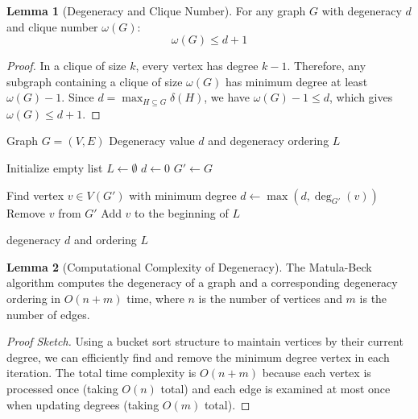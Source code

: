 \documentclass{article}
\theoremstyle{definition}
\newtheorem{lemma}{Lemma}
\begin{document}
\begin{lemma}[Degeneracy and Clique Number]
For any graph $G$ with degeneracy $d$ and clique number $\omega(G)$:
\begin{equation}
\omega(G) \leq d + 1
\end{equation}
\end{lemma}

\begin{proof}
In a clique of size $k$, every vertex has degree $k-1$. Therefore, any subgraph containing a clique of size $\omega(G)$ has minimum degree at least $\omega(G)-1$. Since $d = \max_{H \subseteq G} \delta(H)$, we have $\omega(G) - 1 \leq d$, which gives $\omega(G) \leq d + 1$.
\end{proof}

\begin{algorithm}
\caption{Matula-Beck Algorithm for Computing Degeneracy}
\label{alg:matula-beck}
\begin{algorithmic}[1]
    \Require Graph $G = (V, E)$
    \Ensure Degeneracy value $d$ and degeneracy ordering $L$
    
    \State Initialize empty list $L \gets \emptyset$ 
    \State $d \gets 0$ 
    \State $G' \gets G$ 
    
        \State Find vertex $v \in V(G')$ with minimum degree
        \State $d \gets \max(d, \deg_{G'}(v))$ 
        \State Remove $v$ from $G'$
        \State Add $v$ to the beginning of $L$
    \EndWhile
    
    \State \Return degeneracy $d$ and ordering $L$
\end{algorithmic}
\end{algorithm}

\begin{lemma}[Computational Complexity of Degeneracy]
The Matula-Beck algorithm computes the degeneracy of a graph and a corresponding degeneracy ordering in $O(n + m)$ time, where $n$ is the number of vertices and $m$ is the number of edges.
\end{lemma}

\begin{proof}[Proof Sketch]
Using a bucket sort structure to maintain vertices by their current degree, we can efficiently find and remove the minimum degree vertex in each iteration. The total time complexity is $O(n + m)$ because each vertex is processed once (taking $O(n)$ total) and each edge is examined at most once when updating degrees (taking $O(m)$ total).
\end{proof}
\end{document}
